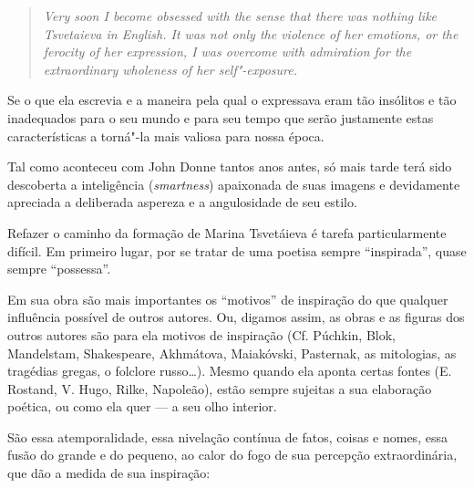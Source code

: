 \begin{quote}
\emph{Very soon I become obsessed with the sense that there was nothing
like Tsvetaieva in English. It was not only the violence of her
emotions, or the ferocity of her expression, I was overcome with
admiration for the extraordinary wholeness of her
self"-exposure}\emph{.}
\end{quote}

Se o que ela escrevia e a maneira pela qual o expressava eram tão
insólitos e tão inadequados para o seu mundo e para seu tempo que serão
justamente estas características a torná"-la mais valiosa para nossa
época.

Tal como aconteceu com John Donne tantos anos antes, só mais tarde terá sido descoberta a inteligência
(\emph{smartness}) apaixonada de suas imagens e devidamente apreciada a
deliberada aspereza e a angulosidade de seu estilo.

Refazer o caminho da formação de Marina Tsvetáieva é tarefa
particularmente difícil. Em primeiro lugar, por se tratar de uma poetisa
sempre ``inspirada'', quase sempre ``possessa''.

Em sua obra são mais importantes os ``motivos'' de inspiração do que
qualquer influência possível de outros autores. Ou, digamos assim, as
obras e as figuras dos outros autores são para ela motivos de inspiração
(Cf. Púchkin, Blok, Mandelstam, Shakespeare, Akhmátova, Maiakóvski,
Pasternak, as mitologias, as tragédias gregas, o folclore russo\ldots{}).
Mesmo quando ela aponta certas fontes (E. Rostand, V. Hugo, Rilke,
Napoleão), estão sempre sujeitas a sua elaboração poética, ou como ela
quer --- a seu olho interior.

São essa atemporalidade, essa nivelação contínua de fatos, coisas e
nomes, essa fusão do grande e do pequeno, ao calor do fogo de sua
percepção extraordinária, que dão a medida de sua inspiração:

